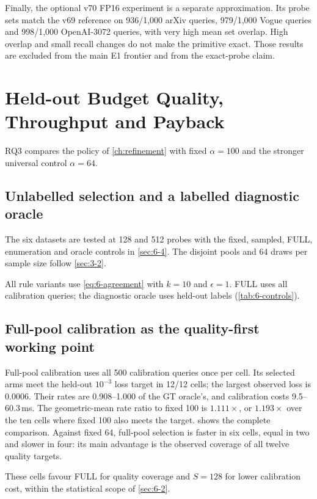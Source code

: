 Finally, the optional v70 FP16 experiment is a separate approximation.
Its probe sets match the v69 reference on 936/1,000 arXiv queries, 979/1,000
Vogue queries and 998/1,000 OpenAI-3072 queries, with very high mean
set overlap. High overlap and small recall changes do not make the
primitive exact. Those results are excluded from the main E1 frontier
and from the exact-probe claim.

\section{Held-out Budget Quality, Throughput and Payback}
\label{sec:7-5}

RQ3 compares the policy of \cref{ch:refinement} with fixed
$\alpha=100$ and the stronger universal control $\alpha=64$.

\subsection{Unlabelled selection and a labelled diagnostic oracle}

The six datasets are tested at 128 and 512 probes with the fixed,
sampled, FULL, enumeration and oracle controls in \cref{sec:6-4}.
The disjoint pools and 64 draws per sample size follow \cref{sec:3-2}.


All rule variants use \cref{eq:6-agreement} with $k=10$ and $\epsilon=1$.
FULL uses all calibration queries; the diagnostic oracle uses held-out
labels (\cref{tab:6-controls}).


\subsection{Full-pool calibration as the quality-first working point}

Full-pool calibration uses all 500 calibration queries once per cell.
Its selected arms meet the held-out $10^{-3}$ loss target in 12/12 cells;
the largest observed loss is 0.0006. Their rates are 0.908--1.000 of the
GT oracle's, and calibration costs 9.5--60.3\,ms. The geometric-mean
rate ratio to fixed 100 is $1.111\times$, or $1.193\times$ over the ten
cells where fixed 100 also meets the target. 
shows the complete comparison. Against fixed 64, full-pool selection is
faster in six cells, equal in two and slower in four: its main advantage
is the observed coverage of all twelve quality targets.

These cells favour FULL for quality coverage and $S=128$ for lower
calibration cost, within the statistical scope of \cref{sec:6-2}.



